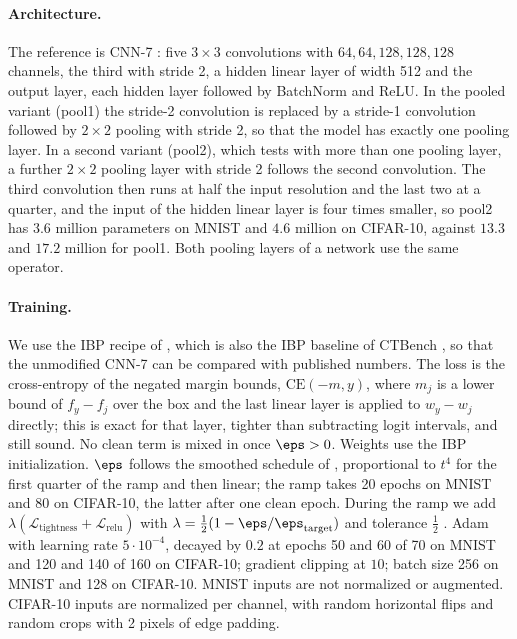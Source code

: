 \paragraph{Architecture.} The reference is CNN-7 \cite{shi2021}: five $3\times3$ convolutions with $64,64,128,128,128$ channels, the third with stride 2, a hidden linear layer of width 512 and the output layer, each hidden layer followed by BatchNorm and ReLU. In the pooled variant (pool1) the stride-2 convolution is replaced by a stride-1 convolution followed by $2\times2$ pooling with stride 2, so that the model has exactly one pooling layer. In a second variant (pool2), which tests  with more than one pooling layer, a further $2\times2$ pooling layer with stride 2 follows the second convolution. The third convolution then runs at half the input resolution and the last two at a quarter, and the input of the hidden linear layer is four times smaller, so pool2 has $3.6$ million parameters on MNIST and $4.6$ million on CIFAR-10, against $13.3$ and $17.2$ million for pool1. Both pooling layers of a network use the same operator.

\paragraph{Training.} We use the IBP recipe of \citet{shi2021}, which is also the IBP baseline of CTBench \cite{mao2024ctbench}, so that the unmodified CNN-7 can be compared with published numbers. The loss is the cross-entropy of the negated margin bounds, $\mathrm{CE}(-m,y)$, where $m_j$ is a lower bound of $f_y-f_j$ over the box and the last linear layer is applied to $w_y-w_j$ directly; this is exact for that layer, tighter than subtracting logit intervals, and still sound. No clean term is mixed in once $\eps>0$. Weights use the IBP initialization. $\eps$ follows the smoothed schedule of \citet{gowal2018}, proportional to $t^4$ for the first quarter of the ramp and then linear; the ramp takes 20 epochs on MNIST and 80 on CIFAR-10, the latter after one clean epoch. During the ramp we add $\lambda(\mathcal L_{\mathrm{tightness}}+\mathcal L_{\mathrm{relu}})$ with $\lambda=\tfrac12(1-\eps/\eps_{\mathrm{target}})$ and tolerance $\tfrac12$ \cite{shi2021}. Adam with learning rate $5\cdot10^{-4}$, decayed by $0.2$ at epochs 50 and 60 of 70 on MNIST and 120 and 140 of 160 on CIFAR-10; gradient clipping at $10$; batch size 256 on MNIST and 128 on CIFAR-10. MNIST inputs are not normalized or augmented. CIFAR-10 inputs are normalized per channel, with random horizontal flips and random crops with 2 pixels of edge padding.

